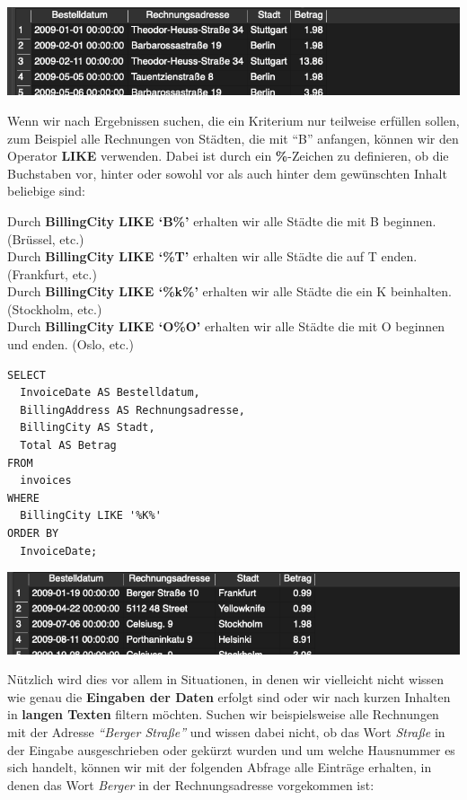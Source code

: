 \documentclass[
]{book}
\begin{document}
\includegraphics[width=10.41667in,height=\textheight]{img-WHERE4.png}

Wenn wir nach Ergebnissen suchen, die ein Kriterium nur teilweise erfüllen sollen, zum Beispiel alle Rechnungen von Städten, die mit ``B'' anfangen, können wir den Operator \textbf{LIKE} verwenden. Dabei ist durch ein \textbf{\%}-Zeichen zu definieren, ob die Buchstaben vor, hinter oder sowohl vor als auch hinter dem gewünschten Inhalt beliebige sind:

Durch \textbf{BillingCity LIKE `B\%'} erhalten wir alle Städte die mit B beginnen. (Brüssel, etc.)\\
Durch \textbf{BillingCity LIKE `\%T'} erhalten wir alle Städte die auf T enden. (Frankfurt, etc.)\\
Durch \textbf{BillingCity LIKE `\%k\%'} erhalten wir alle Städte die ein K beinhalten. (Stockholm, etc.)\\
Durch \textbf{BillingCity LIKE `O\%O'} erhalten wir alle Städte die mit O beginnen und enden. (Oslo, etc.)

\begin{verbatim}
SELECT
  InvoiceDate AS Bestelldatum,
  BillingAddress AS Rechnungsadresse,
  BillingCity AS Stadt,
  Total AS Betrag
FROM
  invoices
WHERE
  BillingCity LIKE '%K%'
ORDER BY
  InvoiceDate;
\end{verbatim}

\includegraphics[width=10.41667in,height=\textheight]{img-WHERE8.png}

Nützlich wird dies vor allem in Situationen, in denen wir vielleicht nicht wissen wie genau die \textbf{Eingaben der Daten} erfolgt sind oder wir nach kurzen Inhalten in \textbf{langen Texten} filtern möchten. Suchen wir beispielsweise alle Rechnungen mit der Adresse \emph{``Berger Straße''} und wissen dabei nicht, ob das Wort \emph{Straße} in der Eingabe ausgeschrieben oder gekürzt wurden und um welche Hausnummer es sich handelt, können wir mit der folgenden Abfrage alle Einträge erhalten, in denen das Wort \emph{Berger} in der Rechnungsadresse vorgekommen ist:
\end{document}
